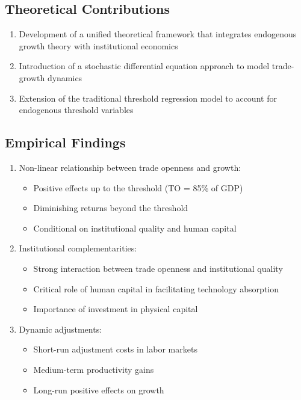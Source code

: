 \documentclass[12pt,a4paper]{article}
\theoremstyle{definition}
\begin{document}
\subsection{Theoretical Contributions}
\begin{enumerate}
    \item Development of a unified theoretical framework that integrates endogenous growth theory with institutional economics
    \item Introduction of a stochastic differential equation approach to model trade-growth dynamics
    \item Extension of the traditional threshold regression model to account for endogenous threshold variables
\end{enumerate}

\subsection{Empirical Findings}
\begin{enumerate}
    \item Non-linear relationship between trade openness and growth:
    \begin{itemize}
        \item Positive effects up to the threshold (TO = 85\% of GDP)
        \item Diminishing returns beyond the threshold
        \item Conditional on institutional quality and human capital
    \end{itemize}
    
    \item Institutional complementarities:
    \begin{itemize}
        \item Strong interaction between trade openness and institutional quality
        \item Critical role of human capital in facilitating technology absorption
        \item Importance of investment in physical capital
    \end{itemize}
    
    \item Dynamic adjustments:
    \begin{itemize}
        \item Short-run adjustment costs in labor markets
        \item Medium-term productivity gains
        \item Long-run positive effects on growth
    \end{itemize}
\end{enumerate}
\end{document}
